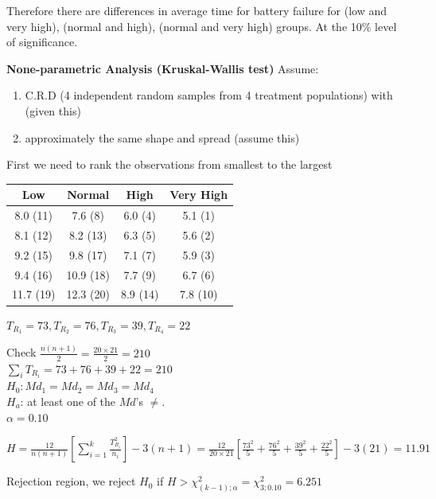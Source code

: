 \documentclass{article}
\begin{document}
\begin{enumerate}[1.]
\begin{enumerate}[1)]
Therefore there are differences in average time for battery failure for (low and very high), (normal and high), (normal and very high) groups. At the 10\% level of significance. 

\end{enumerate}

\textbf{None-parametric Analysis (Kruskal-Wallis test)}
Assume:
\begin{enumerate}[1)]
\item C.R.D (4 independent random samples from 4 treatment populations) with (given this)
\item approximately the same shape and spread (assume this)
\end{enumerate}

First we need to rank the observations from smallest to the largest


\begin{center}
 \begin{tabular}{||c c c c||} 
 \hline
Low & Normal & High & Very High \\ [0.5ex] 
 \hline\hline
8.0 (11) & 7.6 (8) & 6.0 (4) & 5.1 (1) \\
 \hline
8.1 (12) & 8.2 (13) & 6.3 (5) & 5.6 (2) \\
 \hline
9.2 (15) & 9.8 (17) & 7.1 (7) & 5.9 (3) \\
 \hline
9.4 (16) & 10.9 (18) & 7.7 (9) & 6.7 (6) \\
 \hline
11.7  (19) & 12.3 (20) & 8.9 (14) & 7.8 (10) \\ [1ex]
 \hline
\end{tabular}
\end{center}

$T_{R_1} = 73, T_{R_2} = 76, T_{R_3} = 39, T_{R_4} = 22$

Check $\frac{n(n+1)}{2} = \frac{20\times21}{2} = 210$ \\
$\sum_{i}{T_{R_i}} = 73 + 76 + 39 + 22 = 210$ \\

$H_0: Md_1 = Md_2 = Md_3 = Md_4$ \\
$H_a$: at least one of the $Md$'s $\neq$. \\
$\alpha = 0.10$

$H = \frac{12}{n(n+1)}[\sum_{i=1}^{k}{ \frac{T_{R_i}^2}{n_i}}] - 3(n+1) = \frac{12}{20\times21}[\frac{73^2}{5} + \frac{76^2}{5} + \frac{39^2}{5} + \frac{22^2}{5} ] - 3(21) = 11.91$

Rejection region, we reject $H_0$ if $H > \chi_{(k-1);\alpha}^2 = \chi_{3; 0.10}^2 = 6.251$


\end{enumerate}
\end{document}
